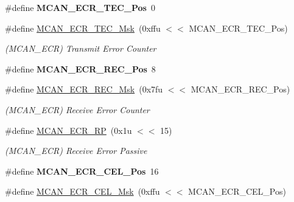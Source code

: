 \begin{DoxyCompactItemize}
\#define {\bfseries M\+C\+A\+N\+\_\+\+E\+C\+R\+\_\+\+T\+E\+C\+\_\+\+Pos}~0
\item 
\mbox{\label{group__SAME70__MCAN_ga9f4a332c5158c62be7223aa07dc7d107}} 
\#define \mbox{\hyperlink{group__SAME70__MCAN_ga9f4a332c5158c62be7223aa07dc7d107}{M\+C\+A\+N\+\_\+\+E\+C\+R\+\_\+\+T\+E\+C\+\_\+\+Msk}}~(0xffu $<$$<$ M\+C\+A\+N\+\_\+\+E\+C\+R\+\_\+\+T\+E\+C\+\_\+\+Pos)
\begin{DoxyCompactList}\small\item\em (M\+C\+A\+N\+\_\+\+E\+CR) Transmit Error Counter \end{DoxyCompactList}\item 
\mbox{\label{group__SAME70__MCAN_gab238e31d590b78aa6af737f621243fbd}} 
\#define {\bfseries M\+C\+A\+N\+\_\+\+E\+C\+R\+\_\+\+R\+E\+C\+\_\+\+Pos}~8
\item 
\mbox{\label{group__SAME70__MCAN_gad879edddc84f5813e80b170716cadc79}} 
\#define \mbox{\hyperlink{group__SAME70__MCAN_gad879edddc84f5813e80b170716cadc79}{M\+C\+A\+N\+\_\+\+E\+C\+R\+\_\+\+R\+E\+C\+\_\+\+Msk}}~(0x7fu $<$$<$ M\+C\+A\+N\+\_\+\+E\+C\+R\+\_\+\+R\+E\+C\+\_\+\+Pos)
\begin{DoxyCompactList}\small\item\em (M\+C\+A\+N\+\_\+\+E\+CR) Receive Error Counter \end{DoxyCompactList}\item 
\mbox{\label{group__SAME70__MCAN_gafc02132b36db5a896071fd0a7ba2b89c}} 
\#define \mbox{\hyperlink{group__SAME70__MCAN_gafc02132b36db5a896071fd0a7ba2b89c}{M\+C\+A\+N\+\_\+\+E\+C\+R\+\_\+\+RP}}~(0x1u $<$$<$ 15)
\begin{DoxyCompactList}\small\item\em (M\+C\+A\+N\+\_\+\+E\+CR) Receive Error Passive \end{DoxyCompactList}\item 
\mbox{\label{group__SAME70__MCAN_gaf00f150181ed3603bfe6f31197f680d4}} 
\#define {\bfseries M\+C\+A\+N\+\_\+\+E\+C\+R\+\_\+\+C\+E\+L\+\_\+\+Pos}~16
\item 
\mbox{\label{group__SAME70__MCAN_ga3c451715946bb69ac78d53442f03996e}} 
\#define \mbox{\hyperlink{group__SAME70__MCAN_ga3c451715946bb69ac78d53442f03996e}{M\+C\+A\+N\+\_\+\+E\+C\+R\+\_\+\+C\+E\+L\+\_\+\+Msk}}~(0xffu $<$$<$ M\+C\+A\+N\+\_\+\+E\+C\+R\+\_\+\+C\+E\+L\+\_\+\+Pos)

\end{DoxyCompactItemize}
